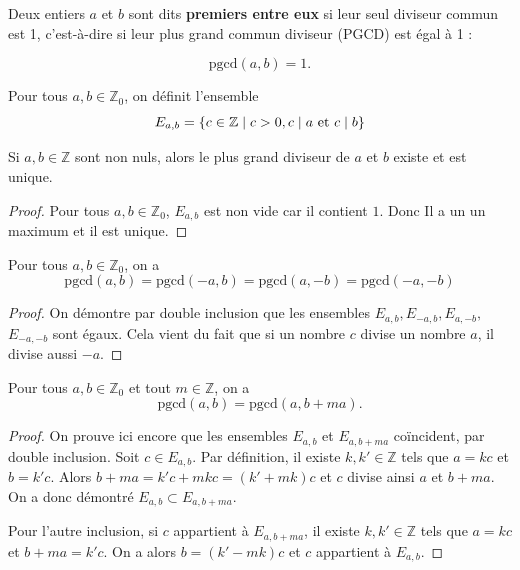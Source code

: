 \begin{definition}
    Deux entiers \( a \) et \( b \) sont dits \textbf{premiers entre eux} si leur seul diviseur commun est 1, c'est-à-dire si leur plus grand commun diviseur (PGCD) est égal à 1 :  

\[
\text{pgcd}(a, b) = 1.
\]
\end{definition}

\begin{definition}
    Pour tous $a,b\in \mathbb{Z}_0$, on définit l'ensemble
    \[
    E_{a,b}=\{c\in \mathbb{Z}\mid c>0, c\mid a\\ \mathrm{\ et\ } c\mid b\}
    \]
\end{definition}

\begin{proposition}
    Si $a,b\in \mathbb{Z}$ sont non nuls, alors le plus grand diviseur de $a$ et $b$ existe et est unique.
\end{proposition}

\begin{proof}
    Pour tous $a,b\in \mathbb{Z}_0$, $E_{a,b}$ est non vide car il contient $1$. Donc Il a un un maximum et il est unique. 
\end{proof}

\begin{proposition}
    Pour tous $a,b\in \mathbb{Z}_0$, on a
    \[
    \text{pgcd}(a,b)=\text{pgcd}(-a,b)=\text{pgcd}(a,-b)=\text{pgcd}(-a,-b)
    \]
\end{proposition}

\begin{proof}
    On démontre par double inclusion que les ensembles $E_{a,b},E_{-a,b},E_{a,-b},$\\$E_{-a,-b}$ sont égaux. Cela vient du fait que si un nombre $c$ divise un nombre $a$, il divise aussi $-a$.
\end{proof}

\begin{proposition}
Pour tous \( a, b \in \mathbb{Z}_0 \) et tout \( m \in \mathbb{Z} \), on a 
\[
\text{pgcd}(a,b) = \text{pgcd}(a, b + ma).
\]
\end{proposition}

\begin{proof}
On prouve ici encore que les ensembles \( E_{a,b} \) et \( E_{a,b+ma} \) coïncident, par double inclusion.  
Soit \( c \in E_{a,b} \). Par définition, il existe \( k, k' \in \mathbb{Z} \) tels que \( a = kc \) et \( b = k'c \).  
Alors \( b + ma = k'c + mkc = (k' + mk)c \) et \( c \) divise ainsi \( a \) et \( b + ma \).  
On a donc démontré \( E_{a,b} \subset E_{a,b+ma} \).  

Pour l’autre inclusion, si \( c \) appartient à \( E_{a,b+ma} \), il existe \( k, k' \in \mathbb{Z} \) tels que \( a = kc \) et \( b + ma = k'c \).  
On a alors \( b = (k' - mk)c \) et \( c \) appartient à \( E_{a,b} \).  
\end{proof}

